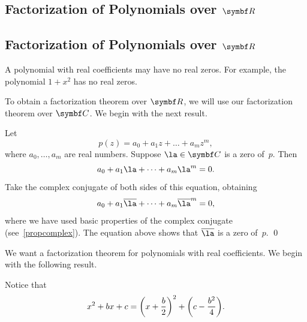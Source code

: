 \pagebreak[3]

\ifnum{}
    \subsection{\texorpdfstring{Factorization of Polynomials over $\R{}$}{Factorization of Polynomials over R}} %
    \else
    \subsection{Factorization of Polynomials over $\R{}$}
    \fi


A polynomial with real coefficients may have no real zeros.  For example, the
polynomial\/ $1 + x^2$ has no real zeros.

To obtain a factorization theorem over $\R{}$, we will use our factorization theorem over $\C{}$. We begin with the next result.


\proof
Let
\[
p(z) = a_0 + a_1 z + \dots + a_m z^m\!,
\]
where $a_0, \dots, a_m$ are real numbers.  Suppose $\la \in \C{}$ is a zero
of~$p$.  Then
\[
a_0 + a_1 \la + \dots + a_m \la^m = 0.
\]
Take the complex conjugate of both sides of this equation, obtaining
\[
a_0 + a_1 \bar{\la} + \dots + a_m \bar{\la}^m = 0,
\]
where we have used basic properties of the complex conjugate (see~\ref{propcomplex}).  The equation above shows that $\bar{\la}$ is a zero of~$p$.
\qed


We want a factorization theorem for polynomials with real
coefficients.  We begin with the following result.


\proof
Notice that
\[
x^2 + b x + c =
\paren[\bigg]{x + \frac{b}{2}}^2 + \paren[\bigg]{c -\frac{b^2}{4}}.
\]

